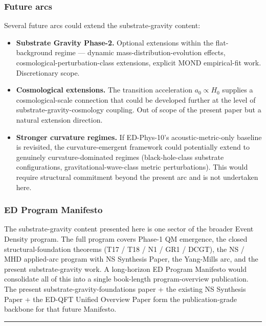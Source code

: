 \documentclass[
  11pt,a4paper]{article}
\providecommand{\tightlist}{%
  \setlength{\itemsep}{0pt}\setlength{\parskip}{0pt}}
\begin{document}
\subsubsection{Future arcs}\label{future-arcs}

Several future arcs could extend the substrate-gravity content:

\begin{itemize}
\tightlist
\item
  \textbf{Substrate Gravity Phase-2.} Optional extensions within the
  flat-background regime --- dynamic mass-distribution-evolution
  effects, cosmological-perturbation-class extensions, explicit MOND
  empirical-fit work. Discretionary scope.
\item
  \textbf{Cosmological extensions.} The transition acceleration
  \(a_0 \propto H_0\) supplies a cosmological-scale connection that
  could be developed further at the level of substrate-gravity-cosmology
  coupling. Out of scope of the present paper but a natural extension
  direction.
\item
  \textbf{Stronger curvature regimes.} If ED-Phys-10's
  acoustic-metric-only baseline is revisited, the curvature-emergent
  framework could potentially extend to genuinely curvature-dominated
  regimes (black-hole-class substrate configurations,
  gravitational-wave-class metric perturbations). This would require
  structural commitment beyond the present arc and is not undertaken
  here.
\end{itemize}

\subsubsection{ED Program Manifesto}\label{ed-program-manifesto}

The substrate-gravity content presented here is one sector of the
broader Event Density program. The full program covers Phase-1 QM
emergence, the closed structural-foundation theorems (T17 / T18 / N1 /
GR1 / DCGT), the NS / MHD applied-arc program with NS Synthesis Paper,
the Yang-Mills arc, and the present substrate-gravity work. A
long-horizon ED Program Manifesto would consolidate all of this into a
single book-length program-overview publication. The present
substrate-gravity-foundations paper + the existing NS Synthesis Paper +
the ED-QFT Unified Overview Paper form the publication-grade backbone
for that future Manifesto.

\begin{center}\rule{0.5\linewidth}{0.5pt}\end{center}
\end{document}
